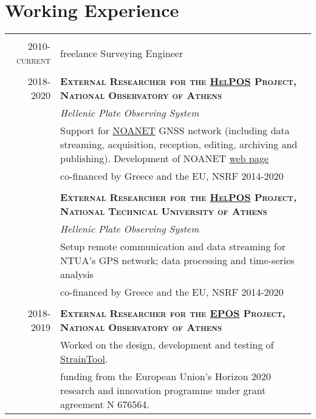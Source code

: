 \documentclass[9pt]{extarticle} %
\begin{document}
\section{Working Experience}
%
\begin{longtable}{r|p{13cm}}
%
\multicolumn{2}{c}{} \\
\textsc{2010-current} & freelance Surveying Engineer\\ 
%
\multicolumn{2}{c}{} \\
\textsc{2018-2020} & \textbf{\textsc{External Researcher for the \href{https://www.epos-ip.org/}{HelPOS} Project, National Observatory of Athens}}\\
  & \textit{\small Hellenic Plate Observing System}\\
  & Support for \href{http://geodesy.gein.noa.gr:8000/nginfo/}{NOANET} GNSS network (including data streaming, acquisition, reception, editing, archiving and publishing). Development of NOANET \href{http://geodesy.gein.noa.gr:8000/nginfo/}{web page}\\
  & co-financed by Greece and the EU, NSRF 2014-2020\\
  \\
  & \textbf{\textsc{External Researcher for the \href{https://www.epos-ip.org/}{HelPOS} Project, National Technical University of Athens}}\\
  & \textit{\small Hellenic Plate Observing System}\\
  & Setup remote communication and data streaming for NTUA's GPS network; data processing and time-series analysis\\
  & co-financed by Greece and the EU, NSRF 2014-2020\\
%
\multicolumn{2}{c}{} \\
\textsc{2018-2019} & \textbf{\textsc{External Researcher for the \href{https://www.epos-ip.org/}{EPOS} Project, National Observatory of Athens}}\\
  & Worked on the design, development and testing of \href{https://dsolab.github.io/StrainTool/}{StrainTool}.\\
  & funding from the European Union’s Horizon 2020 research and innovation programme under grant agreement N 676564.\\

\end{longtable}
\end{document}
